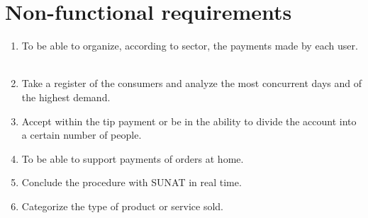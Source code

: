 \documentclass{article}
\begin{document}
\begin{enumerate}
    


    
    
\end{enumerate}

\section{Non-functional requirements}
\begin{enumerate}
    \item To be able to organize, according to sector, the payments made by each user.
     \item Take a register of the consumers and analyze the most concurrent days and of the highest demand.
     \item Accept within the tip payment or be in the ability to divide the account into a certain number of people.
     \item To be able to support payments of orders at home.
     \item Conclude the procedure with SUNAT in real time.
     \item Categorize the type of product or service sold.
    
\end{enumerate}
\end{document}
